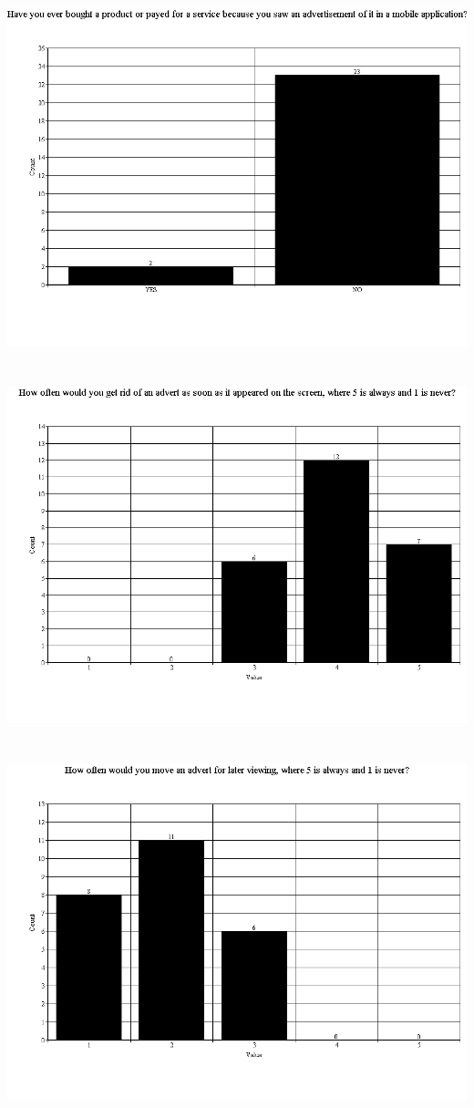 \documentclass[twoside,11pt]{Latex/Classes/PhDthesisPSnPDF}
\begin{document}
\chapter{}
\includegraphics[scale=0.5]{Images/q6}
\chapter{}
\includegraphics[scale=0.5]{Images/q7}
\chapter{}
\includegraphics[scale=0.5]{Images/q8}
\end{document}

